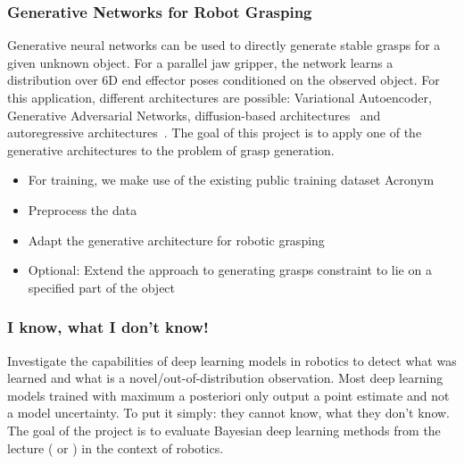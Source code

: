 \documentclass[a4paper]{article}
\begin{document}
\subsubsection{Generative Networks for Robot Grasping}
Generative neural networks can be used to directly generate stable grasps for a given unknown object.
For a parallel jaw gripper, the network learns a distribution over 6D end effector poses conditioned on the observed object.
For this application, different architectures are possible: Variational Autoencoder, Generative Adversarial Networks, diffusion-based architectures~\cite{Ho2020denoising} and autoregressive architectures~\cite{Winkelbauer2022}.
The goal of this project is to apply one of the generative architectures to the problem of grasp generation.
\begin{itemize}
  \item For training, we make use of the existing public training dataset Acronym~\cite{Acronym2021}
  \item Preprocess the data
  \item Adapt the generative architecture for robotic grasping
  \item Optional: Extend the approach to generating grasps constraint to lie on a specified part of the object~\cite{Lundell2023constrained}
\end{itemize}



\subsubsection{I know, what I don't know!}
Investigate the capabilities of deep learning models in robotics to detect what was learned and what is a novel/out-of-distribution observation.
Most deep learning models trained with maximum a posteriori only output a point estimate and not a model uncertainty.
To put it simply: they cannot know, what they don't know. 
The goal of the project is to evaluate Bayesian deep learning methods from the lecture (\cite{Gal2016} or \cite{Blundell2015}) in the context of robotics.
\end{document}
